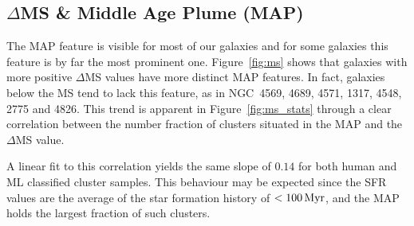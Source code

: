 \documentclass[linenumbers]{aastex63}
\begin{document}
{%


\subsection{$\Delta$MS \& Middle Age Plume (MAP)}\label{sec:map}
The MAP feature is visible for most of our galaxies and for some galaxies this feature is by far the most prominent one. 
Figure~\ref{fig:ms} shows that galaxies with more positive $\Delta$MS values have more distinct MAP features. In fact, galaxies below the MS tend to lack this feature, as in NGC~4569, 4689, 4571, 1317, 4548, 2775 and 4826. 
This trend is apparent in Figure~\ref{fig:ms_stats} through a clear correlation between the number fraction of clusters situated in the MAP and the $\Delta$MS value. 

A linear fit to this correlation yields the same slope of $0.14$ for both human and ML classified cluster samples. This behaviour may be expected since the SFR values are the average of the star formation history of $ < 100\,{\rm Myr}$, and the MAP holds the largest fraction of such clusters. %


}
\end{document}
